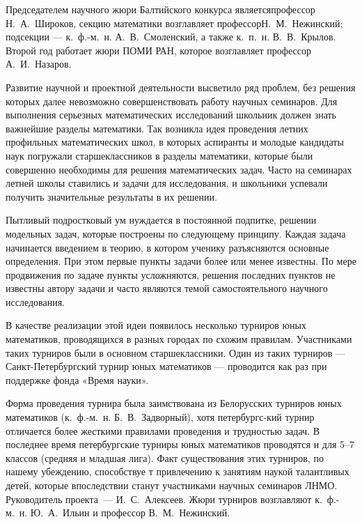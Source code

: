 \ms\abz Председателем научного жюри Балтийского конкурса является\linebreak профессор Н.~А.~Широков, секцию математики возглавляет профессор\linebreak Н.~М.~Нежинский; подсекции — к.~ф.-м.~н. А.~В.~Смоленский, а также к.~п.~н. В.~В.~Крылов. Второй год работает жюри ПОМИ РАН, которое возглавляет профессор А.~И.~Назаров.

\ms\abz Развитие научной и проектной деятельности высветило ряд проблем, без решения которых далее невозможно совершенствовать работу научных семинаров. Для выполнения серьезных математических исследований школьник должен знать важнейшие разделы математики. Так возникла идея проведения летних профильных математических школ, в которых аспиранты и молодые кандидаты наук погружали старшеклассников в разделы математики, которые были совершенно необходимы для решения математических задач. Часто на семинарах летней школы ставились и задачи для исследования, и школьники успевали получить значительные результаты в их решении. 

\ms\abz Пытливый подростковый ум нуждается в постоянной подпитке, решении модельных задач, которые построены по следующему принципу. Каждая задача начинается введением в теорию, в котором ученику разъясняются основные определения. При этом первые пункты задачи более или менее известны. По мере продвижения по задаче пункты усложняются, решения последних пунктов не известны автору задачи и часто являются темой самостоятельного научного исследования.

\ms\abz В качестве реализации этой идеи появилось несколько турниров юных математиков, проводящихся в разных городах по схожим правилам. Участниками таких турниров были в основном старшеклассники. Один из таких турниров — Санкт-Петербургский турнир юных математиков — проводится как раз при поддержке фонда «Время науки».

\ms\abz Форма проведения турнира была заимствована из Белорусских турниров юных математиков (к.~ф.-м.~н. Б.~В.~Задворный), хотя петербургс-\linebreak кий турнир отличается более жесткими правилами проведения и трудностью задач. В последнее время петербургские турниры юных математиков проводятся и для 5–7 классов (средняя и младшая лига). Факт существования этих турниров, по нашему убеждению, способствуе	т привлечению к занятиям наукой талантливых детей, которые впоследствии станут участниками научных семинаров ЛНМО. Руководитель проекта~— И.~С.~Алексеев. Жюри турниров возглавляют к.~ф.-м.~н. Ю.~А.~Ильин и профессор В.~М.~Нежинский.

